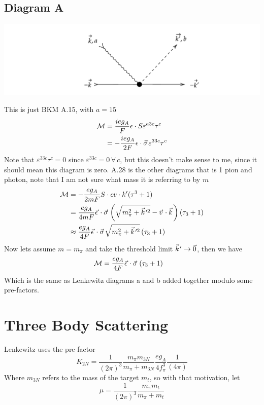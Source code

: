 \documentclass[11pt]{article}
\newcommand\ddfrac[2]{\frac{\displaystyle #1}{\displaystyle #2}}
\newcommand{\vectorwithspace}[1]{\vec{#1}\mkern2mu\vphantom{#1}}
\newcommand{\kv}{\vectorwithspace{k}}
\newcommand{\vv}{\vectorwithspace{v}}
\newcommand{\sigv}{\vectorwithspace{\sigma}}
\newcommand{\epsv}{\vectorwithspace{\epsilon}}
\newcommand{\mpi}{\ensuremath{m_\pi}}
\newcommand{\ga}{\ensuremath{g_A}}
\newcommand{\calM}{\mathcal{M}} \newcommand{\calN}{\mathcal{N}}
\begin{document}
\subsection{Diagram A}
\begin{center}
	\includegraphics[scale=0.7]{1B-diagA.pdf}
\end{center}
This is just BKM A.15, with $a=15$
\begin{align}
	\calM & = \frac{i e \ga}{F} \epsilon \cdot S \varepsilon^{a3c}\tau^c    \\
	      & =-\frac{i e\ga}{2F} \epsilon \cdot \sigv\varepsilon^{33c}\tau^c
\end{align}
Note that $\varepsilon^{33c}\tau^c=0$ since $ \varepsilon^{33c}=0\, \forall\, c$, but this doesn't make sense to me, since it should mean this diagram is zero.
A.28 is the other diagrams that is 1 pion and photon, note that I am not sure what mass it is referring to by $m$
\begin{align}
	\calM & =-\frac{e \ga}{2m F} S \cdot \epsilon v \cdot k' (\tau^3 +1)                                    \\
	      & =\frac{e \ga}{4m F} \epsv \cdot \sigv \left(\sqrt{\mpi^2 +\kv'^2}-\vv\cdot\kv\right) (\tau_3+1) \\
	      & \approx\frac{e \ga}{4 F} \epsv \cdot \sigv \sqrt{\mpi^2 +\kv'^2}\, (\tau_3+1)
\end{align}
Now lets assume $m=\mpi$ and take the threshold limit $\kv'\to\vec{0}$, then we have
\begin{align}
	\calM & =\frac{e \ga}{4 F} \epsv \cdot \sigv \left( \tau_3 + 1 \right)
\end{align}
Which is the same as Lenkewitz diagrams a and b added together modulo some pre-factors.

\section{Three Body Scattering}
Lenkewitz uses the pre-factor
\begin{equation}
	K_{2N}= \frac{1}{(2\pi)^3} \ddfrac{m_\pi m_{3N}}{m_\pi+m_{3N}}
	\ddfrac{ e \ga}{4  f_\pi^3} \frac{1}{(4\pi)}
\end{equation}
Where $m_{3N}$ refers to the mass of the target $m_t$, so with that motivation, let
\begin{equation}
	\mu = \frac{1}{(2\pi)^3}
	\ddfrac{
		\mpi  m_t
	}{
		\mpi +m_t
	}
\end{equation}
\end{document}
